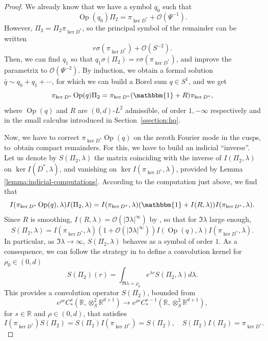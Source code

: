 \documentclass[10pt]{amsart}
\newcommand{\R}{\mathbb{R}}
\DeclareMathOperator{\Op}{Op}
\theoremstyle{plain}
\theoremstyle{definition}
\begin{document}
\begin{proof}
We already know that we have a symbol $q_0$ such that
\[
\Op(q_0)\Pi_2 = \pi_{\ker D^\ast} + \mathcal{O}(\Psi^{-1}).
\]
However, $\Pi_2 = \Pi_2 \pi_{\ker D^\ast}$, so the principal symbol of the remainder can be written
\[
r \sigma(\pi_{\ker D^\ast}) + \mathcal{O}(S^{-2}).
\]
Then, we can find $q_1$ so that $q_1 \sigma(\Pi_2) = r \sigma(\pi_{\ker D^\ast})$, and improve the parametrix to $\mathcal{O}(\Psi^{-2})$. By induction, we obtain a formal solution $\bar{q} \sim q_0 + q_1 + \cdots$, for which we can build a Borel sum $q \in S^1$, and we get
\[
\pi_{\ker D^\ast} \Op(q) \Pi_2 = \pi_{\ker D^\ast}(\mathbbm{1}+ R)\pi_{\ker D^\ast},
\]
where $\Op(q)$ and $R$ are $(0,d)$-$L^2$ admissible, of order $1,-\infty$ respectively and in the small calculus introduced in Section~\ref{ssection:hq}.

Now, we have to correct $\pi_{\ker D^\ast} \Op(q)$ on the zeroth Fourier mode in the cusps, to~obtain compact remainders. For this, we have to build an indicial ``inverse''. Let us denote by $S(\Pi_2,\lambda)$ the matrix coinciding with the inverse of $I(\Pi_2,\lambda)$ on $\ker I(D^\ast, \lambda)$, and vanishing on $\ker I(\pi_{\ker D^\ast},\lambda)$, provided by Lemma \ref{lemma:indicial-computations}. According to the computation just above, we find that
\[
I(\pi_{\ker D^\ast}\Op(q),\lambda)I(\Pi_2,\lambda) = I(\pi_{\ker D^\ast},\lambda)(\mathbbm{1}+I(R,\lambda)) I(\pi_{\ker D^\ast},\lambda).
\]
Since $R$ is smoothing, $I(R,\lambda) = \mathcal{O}(|\Im\lambda|^\infty)$ by \cite[Lem.\,4.7]{Bonthonneau-Lefeuvre-19-1}, so that for $\Im \lambda$ large enough,
\[
S(\Pi_2,\lambda) = I(\pi_{\ker D^\ast},\lambda)(1+\mathcal{O}(|\Im\lambda|^\infty)) I(\Op(q),\lambda) I(\pi_{\ker D^\ast}, \lambda).
\]
In particular, as $\Im \lambda\to \infty$, $S(\Pi_2,\lambda)$ behaves as a symbol of order $1$. As a consequence, we can follow the strategy in \cite[Prop.\,4.5]{Bonthonneau-Lefeuvre-19-1} to define a convolution kernel for $\rho_0\in (0,d)$
\[
S(\Pi_2)(r) = \int_{\Re \lambda = \rho_0} e^{\lambda r} S(\Pi_2,\lambda) d\lambda.
\]
This provides a convolution operator $S(\Pi_2)$, bounded from
\[
e^{\rho r} C^s_\ast(\R,\otimes^2_S \R^{d+1}) \to e^{\rho r} C^{s-1}_{\ast}(\R,\otimes^2_S \R^{d+1}),
\]
for $s\in\R$ and $\rho\in (0,d)$, that satisfies
\[
I(\pi_{\ker D^\ast} ) S(\Pi_2) = S(\Pi_2) I(\pi_{\ker D^\ast}) = S(\Pi_2),\quad S(\Pi_2)I(\Pi_2) = \pi_{\ker D^\ast}.
\]


\end{proof}
\end{document}
